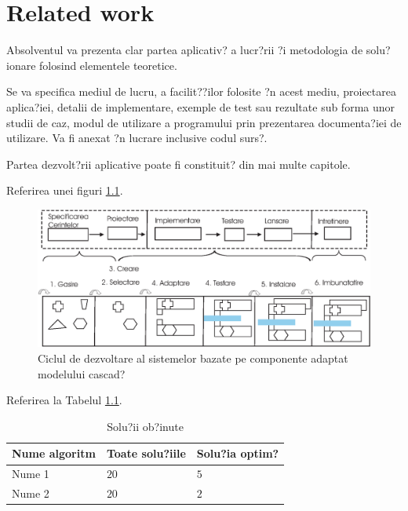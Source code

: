 \chapter{Related work}
\label{CapDA}

Absolventul va prezenta clar partea aplicativ? a lucr?rii ?i metodologia de solu?ionare folosind elementele teoretice.

Se va specifica mediul de lucru, a facilit??ilor folosite ?n acest mediu, proiectarea aplica?iei, detalii de implementare, exemple de test sau rezultate sub forma unor studii de caz, modul de utilizare a programului 
prin prezentarea documenta?iei de utilizare. Va fi anexat ?n lucrare inclusive codul surs?.

Partea dezvolt?rii aplicative poate fi constituit? din mai multe capitole.

Referirea unei figuri \ref{Cap3Figura3-1}.

\begin{figure}[htbp]
	\centering
		\includegraphics[scale=0.65]{Fig/fig_3_1.eps}
	\caption{Ciclul de dezvoltare al sistemelor bazate pe componente adaptat modelului cascad?}
	\label{Cap3Figura3-1}
\end{figure}


Referirea la Tabelul \ref{Cap3Tabel01}. 

\begin{table}[htbp]
\begin{center}
\begin{tabular}
{||p{100pt}||p{60pt}|p{60pt}||}
\hline
 Nume algoritm& 
 Toate solu?iile &
 Solu?ia optim?\\
\hline 
\hline Nume 1 & $20$ & $5$  \\
\hline Nume 2 & $20$ & $2$  \\
\hline
\end{tabular}
\end{center}
\caption{Solu?ii ob?inute }
\label{Cap3Tabel01}
\end{table}



